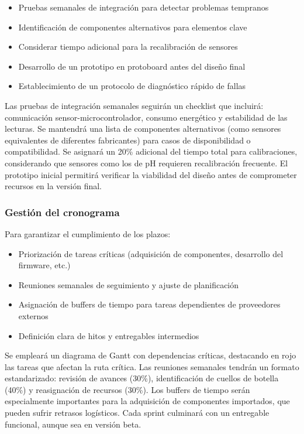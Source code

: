 \documentclass{article}
\begin{document}
\begin{itemize}
    \item Pruebas semanales de integración para detectar problemas tempranos
    \item Identificación de componentes alternativos para elementos clave
    \item Considerar tiempo adicional para la recalibración de sensores
    \item Desarrollo de un prototipo en protoboard antes del diseño final
    \item Establecimiento de un protocolo de diagnóstico rápido de fallas
\end{itemize}

 Las pruebas de integración semanales seguirán un checklist que incluirá: comunicación sensor-microcontrolador, consumo energético y estabilidad de las lecturas. Se mantendrá una lista de componentes alternativos (como sensores equivalentes de diferentes fabricantes) para casos de disponibilidad o compatibilidad. Se asignará un 20\% adicional del tiempo total para calibraciones, considerando que sensores como los de pH requieren recalibración frecuente. El prototipo inicial permitirá verificar la viabilidad del diseño antes de comprometer recursos en la versión final.

\subsubsection{Gestión del cronograma}
Para garantizar el cumplimiento de los plazos:

\begin{itemize}
    \item Priorización de tareas críticas (adquisición de componentes, desarrollo del firmware, etc.)
    \item Reuniones semanales de seguimiento y ajuste de planificación
    \item Asignación de buffers de tiempo para tareas dependientes de proveedores externos
    \item Definición clara de hitos y entregables intermedios
\end{itemize}

 Se empleará un diagrama de Gantt con dependencias críticas, destacando en rojo las tareas que afectan la ruta crítica. Las reuniones semanales tendrán un formato estandarizado: revisión de avances (30\%), identificación de cuellos de botella (40\%) y reasignación de recursos (30\%). Los buffers de tiempo serán especialmente importantes para la adquisición de componentes importados, que pueden sufrir retrasos logísticos. Cada sprint culminará con un entregable funcional, aunque sea en versión beta.
\end{document}
